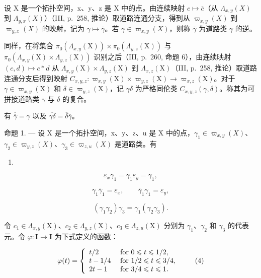 设 X 是一个拓扑空间，x、y、z 是 X 中的点。由连续映射 \(c \mapsto \overline{c}\)（从 \(\Lambda_{x,y}(X)\) 到 \(\Lambda_{y,x}(X)\)）（III, p.~258, 推论）取道路连通分支，得到从 \(\varpi_{x,y}(X)\) 到 \(\varpi_{y,x}(X)\) 的映射，记为 \(\gamma \mapsto \overline{\gamma}\)。若 \(\gamma \in \varpi_{x,y}(X)\)，则称 \(\overline{\gamma}\) 为道路类 \(\gamma\) 的逆。

同样，在将集合 \(\pi_0(\Lambda_{x,y}(\mathrm{X})) \times \pi_0(\Lambda_{y,z}(\mathrm{X}))\) 与 \(\pi_0(\Lambda_{x,y}(\mathrm{X}) \times \Lambda_{y,z}(\mathrm{X}))\) 识别之后（III, p.~260, 命题 6），由连续映射 \((c,d) \mapsto c * d\) 从 \(\Lambda_{x,y}(\mathrm{X}) \times \Lambda_{y,z}(\mathrm{X})\) 到 \(\Lambda_{x,z}(\mathrm{X})\)（III, p.~258, 推论）取道路连通分支后得到映射 \(C_{x,y,z} \colon \varpi_{x,y}(\mathrm{X}) \times \varpi_{y,z}(\mathrm{X}) \to \varpi_{x,z}(\mathrm{X})\)。对于 \(\gamma \in \varpi_{x,y}(\mathrm{X})\) 和 \(\delta \in \varpi_{y,z}(\mathrm{X})\)，记 \(\gamma \delta\) 为严格同伦类 \(C_{x,y,z}(\gamma,\delta)\)。称其为可拼接道路类 \(\gamma\) 与 \(\delta\) 的复合。

有 \(\overline{\overline{\gamma}}=\gamma\) 以及 \(\overline{\gamma\delta}=\overline{\delta}\overline{\gamma}\)。

命题 1. --- 设 X 是一个拓扑空间，x、y、z、u 是 X 中的点，\(\gamma_{1} \in \varpi_{x,y}(X)\)、\(\gamma_{2} \in \varpi_{y,z}(X)\)、\(\gamma_{3} \in \varpi_{z,u}(X)\) 是道路类。有

\begin{enumerate}
\def\labelenumi{(\arabic{enumi})}
\tightlist
\item
\end{enumerate}

\[
\varepsilon_ {x} \gamma_ {1} = \gamma_ {1} \varepsilon_ {y} = \gamma_ {1},\tag{2}
\]

\[
\gamma_ {1} \overline {{\gamma}} _ {1} = \varepsilon_ {x}, \qquad \overline {{\gamma}} _ {1} \gamma_ {1} = \varepsilon_ {y},\tag{3}
\]

\[
(\gamma_ {1} \gamma_ {2}) \gamma_ {3} = \gamma_ {1} (\gamma_ {2} \gamma_ {3}).
\]

令 \(c_{1} \in \Lambda_{x,y}(\mathrm{X})\)、\(c_{2} \in \Lambda_{y,z}(\mathrm{X})\)、\(c_{3} \in \Lambda_{z,u}(\mathrm{X})\) 分别为 \(\gamma_{1}\)、\(\gamma_{2}\) 和 \(\gamma_{3}\) 的代表元。令 \(\varphi: \mathbf{I} \to \mathbf{I}\) 为下式定义的函数：

\[
\varphi (t) = \left\{ \begin{array}{l l} t / 2 & \text { for } 0 \leqslant t \leqslant 1 / 2, \\ t - 1 / 4 & \text { for } 1 / 2 \leqslant t \leqslant 3 / 4, \\ 2 t - 1 & \text { for } 3 / 4 \leqslant t \leqslant 1. \end{array} \right.\tag{4}
\]

